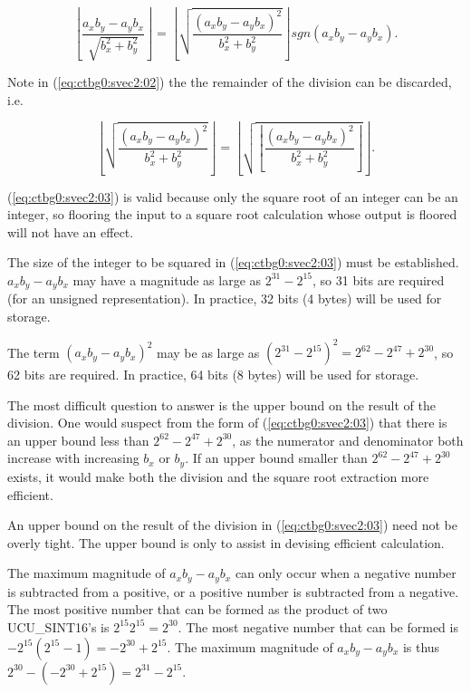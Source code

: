 \begin{equation}
\label{eq:ctbg0:svec2:02}
\left\lfloor \frac{a_x b_y - a_y b_x}{\sqrt{b_x^2 + b_y^2}} \right\rfloor
=
\left\lfloor \sqrt{\frac{(a_x b_y - a_y b_x)^2}{b_x^2 + b_y^2}} \right\rfloor sgn (a_x b_y - a_y b_x).
\end{equation}

Note in (\ref{eq:ctbg0:svec2:02})
the the remainder of the division can be discarded, i.e.

\begin{equation}
\label{eq:ctbg0:svec2:03}
\left\lfloor \sqrt{\frac{(a_x b_y - a_y b_x)^2}{b_x^2 + b_y^2}} \right\rfloor
=
\left\lfloor \sqrt{\left\lfloor\frac{(a_x b_y - a_y b_x)^2}{b_x^2 + b_y^2}\right\rfloor} \right\rfloor .
\end{equation}

\noindent{}(\ref{eq:ctbg0:svec2:03}) is valid because only the square root of an integer can be 
an integer, so flooring the input to a square root calculation whose output is floored
will not have an effect.

The size of the integer to be squared in (\ref{eq:ctbg0:svec2:03}) must be established.
$a_x b_y - a_y b_x$ may have a magnitude as large as $2^{31}-2^{15}$, so 31 bits are required (for an unsigned representation).
In practice, 32 bits (4 bytes) will be used for storage.

The term $(a_x b_y - a_y b_x)^2$ may be as large as $(2^{31}-2^{15})^2 = 2^{62}-2^{47}+2^{30}$, so 62 bits are required.
In practice, 64 bits (8 bytes) will be used for storage.

The most difficult question to answer is the upper bound on the result of the
division.  One would suspect from the form of (\ref{eq:ctbg0:svec2:03})
that there is an upper bound less than $2^{62}-2^{47}+2^{30}$, as the
numerator and denominator both increase with increasing $b_x$ or $b_y$.
If an upper bound smaller than $2^{62}-2^{47}+2^{30}$ exists, it would make
both the division and the square root extraction more efficient.

An upper bound on the result of the division in (\ref{eq:ctbg0:svec2:03})
need not be overly tight.  The upper bound is only to assist in devising
efficient calculation.

The maximum magnitude of $a_x b_y - a_y b_x$ can only occur when a negative
number is subtracted from a positive, or a positive number is subtracted from
a negative.  The most positive number that can be formed as the product
of two UCU\_SINT16's is $2^{15}2^{15} = 2^{30}$.  The most negative number that can be formed
is $-2^{15}(2^{15}-1) = -2^{30}+2^{15}$.  The maximum magnitude of
$a_x b_y - a_y b_x$ is thus $2^{30} - (-2^{30}+2^{15}) = 2^{31} - 2^{15}$.

